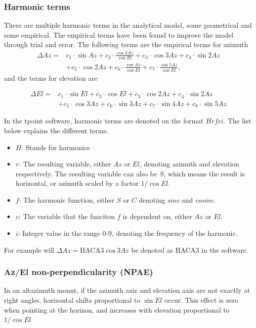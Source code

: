\subsubsection{Harmonic terms}
There are multiple harmonic terms in the analytical model, some geometrical and some empirical.
The empirical terms have been found to improve the model through trial and error.
The following terms are the empirical terms for azimuth
\begin{align}
    \Delta Az =&  c_1 \cdot \sin{Az} + c_2 \cdot \frac{\cos{2Az}}{\cos{El}} + c_3 \cdot \cos{3Az} + c_4 \cdot \sin{2Az} \\
    &+ c_5 \cdot \cos{2Az} + c_6 \cdot \frac{\cos{Az}}{\cos{El}} + c_7 \cdot \frac{\cos{5Az}}{\cos{El}},
\end{align}
and the terms for elevation are

\begin{align}
    \Delta El =&  c_1 \cdot \sin{El} + c_2 \cdot \cos{El}+ c_3 \cdot \cos{2Az} + c_4 \cdot \sin{2Az} \\
    &+ c_5 \cdot \cos{3Az} + c_6 \cdot \sin{3Az} + c_7 \cdot \sin{4Az} + c_8 \cdot \sin{5Az}  
\end{align}


In the tpoint software, harmonic terms are denoted on the format $Hrfci$. The list below explains the different terms.
\begin{itemize}
    \item $H$: Stands for harmonics
    \item $r$: The resulting variable, either $Az$ or $El$, denoting azimuth and elevation respectively.
    The resulting variable can also be $S$, which means the result is horizontal, or azimuth scaled by a factor $1/\cos{El}$.
    \item $f$: The harmonic function, either $S$ or $C$ denoting \textit{sine} and \textit{cosine}.
    \item $c$: The variable that the funciton $f$ is dependent on, either $Az$ or $El$.
    \item $i$: Integer value in the range $0$-$9$, denoting the frequency of the harmonic.
\end{itemize}

For example will $\Delta Az = \text{HACA3}\cos{3Az}$ be denoted as HACA3 in the software.

\subsubsection{Az/El non-perpendicularity (NPAE)}
In an altazimuth mount, if the azimuth axis and elevation axis are not exactly at
right angles, horizontal shifts proportional to $\sin{El}$ occur. This effect is zero when pointing at the horizon, and increases with elevation proportional to $1/\cos{El}$


